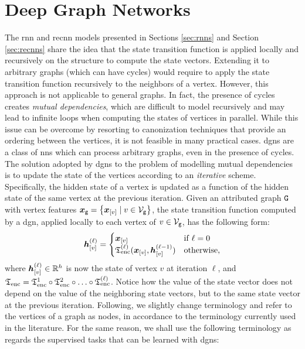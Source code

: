 \section{Deep Graph Networks} \label{sec:dgns}
The \gls{rnn} and \gls{recnn} models presented in Sections \ref{sec:rnns} and Section \ref{sec:recnns} share the idea that the state transition function is applied locally and recursively on the structure to compute the state vectors. Extending it to arbitrary graphs (which can have cycles) would require to apply the state transition function recursively to the neighbors of a vertex. However, this approach is not applicable to general graphs. In fact, the presence of cycles creates \emph{mutual dependencies}, which are difficult to model recursively and may lead to infinite loops when computing the states of vertices in parallel. While this issue can be overcome by resorting to canonization techniques that provide an ordering between the vertices, it is not feasible in many practical cases. \glspl{dgn} are a class of \glspl{nn} which can process arbitrary graphs, even in the presence of cycles. The solution adopted by \glspl{dgn} to the problem of modelling mutual dependencies is to update the state of the vertices according to an \emph{iterative} scheme. Specifically, the hidden state of a vertex is updated as a function of the hidden state of the same vertex at the previous iteration. Given an attributed graph $\AttrGraph{g}$ with vertex features $\GraphFeatures{x}{g} = \Set{\Elem{x}{v} \mid v \in \Nodes{g}}$, the state transition function computed by a \gls{dgn}, applied locally to each vertex of $v \in \Nodes{g}$, has the following form:
\begin{align*}
    \StateVector{v}{\ell}=
    \begin{cases}
        \Elem{x}{v} & \mathrm{if}\; \ell = 0\\
        \EncTrans^{(\ell)}(\Elem{x}{v}, \StateVector{v}{\ell-1}) & \mathrm{otherwise},
    \end{cases}
\end{align*}
where $\StateVector{v}{\ell} \in \Real^h$ is now the state of vertex $v$ at iteration $\ell$, and $\mathfrak{T}_{\mathrm{enc}} = \mathfrak{T}_{\mathrm{enc}}^{1} \circ \mathfrak{T}_{\mathrm{enc}}^{2} \circ \ldots \circ \mathfrak{T}_{\mathrm{enc}}^{(\ell)}$. Notice how the value of the state vector does not depend on the value of the neighboring state vectors, but to the same state vector at the previous iteration. Following, we slightly change terminology and refer to the vertices of a graph as nodes, in accordance to the terminology currently used in the literature. For the same reason, we shall use the following terminology as regards the supervised tasks that can be learned with \glspl{dgn}:
